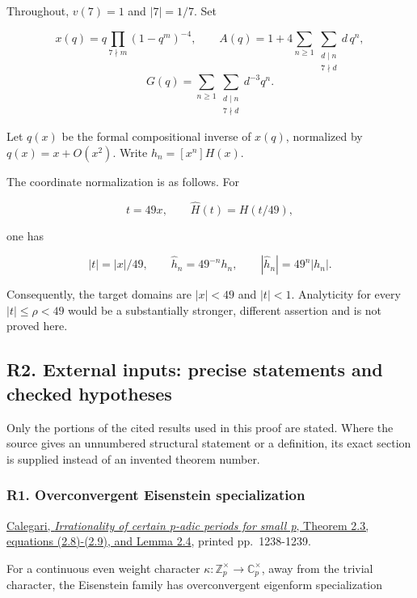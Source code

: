 \documentclass[11pt,a4paper]{article}
\begin{document}
Throughout, \(v(7)=1\) and \(|7|=1/7\). Set

\[
x(q)=q\prod_{7\nmid m}(1-q^m)^{-4},\qquad
A(q)=1+4\sum_{n\ge1}\sum_{\substack{d\mid n\\7\nmid d}}d\,q^n,
\] \[
G(q)=\sum_{n\ge1}\sum_{\substack{d\mid n\\7\nmid d}}d^{-3}q^n.
\]

Let \(q(x)\) be the formal compositional inverse of \(x(q)\), normalized by \(q(x)=x+O(x^2)\). Write \(h_n=[x^n]H(x)\).

The coordinate normalization is as follows. For

\[
t=49x,\qquad \widehat H(t)=H(t/49),
\]

one has

\[
|t|=|x|/49,\qquad \widehat h_n=49^{-n}h_n,
\qquad |\widehat h_n|=49^n|h_n|.
\tag{R1}
\]

Consequently, the target domains are \(|x|<49\) and \(|t|<1\). Analyticity for every \(|t|\le\rho<49\) would be a substantially stronger, different assertion and is not proved here.

\hypertarget{r2.-external-inputs-precise-statements-and-checked-hypotheses}{%
\subsection{R2. External inputs: precise statements and checked hypotheses}\label{r2.-external-inputs-precise-statements-and-checked-hypotheses}}

Only the portions of the cited results used in this proof are stated. Where the source gives an unnumbered structural statement or a definition, its exact section is supplied instead of an invented theorem number.

\hypertarget{r1.-overconvergent-eisenstein-specialization}{%
\subsubsection{R1. Overconvergent Eisenstein specialization}\label{r1.-overconvergent-eisenstein-specialization}}

\href{https://www.math.uchicago.edu/~fcale/papers/Beukers.pdf}{Calegari, \emph{Irrationality of certain p-adic periods for small p}, Theorem 2.3, equations (2.8)-(2.9), and Lemma 2.4}, printed pp.~1238-1239.

For a continuous even weight character \(\kappa:\mathbb Z_p^\times\to\mathbb C_p^\times\), away from the trivial character, the Eisenstein family has overconvergent eigenform specialization
\end{document}
